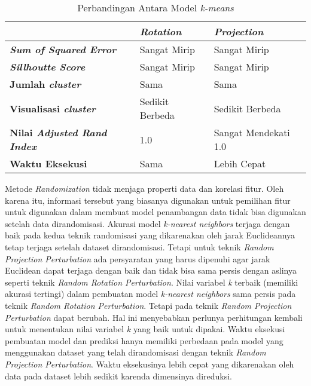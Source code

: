 \begin{table}
	\centering
	\caption{Perbandingan Antara Model \textit{k-means}}
	\begin{tabular}{|l|l|l|}
		\hline
		& \textbf{\textit{Rotation}} & \textbf{\textit{Projection}} \\ \hline
		\textbf{\textit{Sum of Squared Error}} & Sangat Mirip & Sangat Mirip \\
		\textbf{\textit{Sillhoutte Score}} & Sangat Mirip & Sangat Mirip \\
		\textbf{Jumlah \textit{cluster}} & Sama & Sama \\
		\textbf{Visualisasi \textit{cluster}} & Sedikit Berbeda & Sedikit Berbeda \\
		\textbf{Nilai \textit{Adjusted Rand Index}} & 1.0 & Sangat Mendekati 1.0 \\
		\textbf{Waktu Eksekusi} & Sama & Lebih Cepat \\
		\hline
	\end{tabular}
	\label{table:perbandingan-clustering}
\end{table}

Metode \textit{Randomization} tidak menjaga properti data dan korelasi fitur. Oleh karena itu, informasi tersebut yang biasanya digunakan untuk pemilihan fitur untuk digunakan dalam membuat model penambangan data tidak bisa digunakan setelah data dirandomisasi. Akurasi model \textit{k-nearest neighbors} terjaga dengan baik pada kedua teknik randomisasi yang dikarenakan oleh jarak Euclideannya tetap terjaga setelah dataset dirandomisasi. Tetapi untuk teknik \textit{Random Projection Perturbation} ada persyaratan yang harus dipenuhi agar jarak Euclidean dapat terjaga dengan baik dan tidak bisa sama persis dengan aslinya seperti teknik \textit{Random Rotation Perturbation}. Nilai variabel \textit{k} terbaik (memiliki akurasi tertingi) dalam pembuatan model \textit{k-nearest neighbors} sama persis pada teknik \textit{Random Rotation Perturbation}. Tetapi pada teknik \textit{Random Projection Perturbation} dapat berubah. Hal ini menyebabkan perlunya perhitungan kembali untuk menentukan nilai variabel \textit{k} yang baik untuk dipakai. Waktu eksekusi pembuatan model dan prediksi hanya memiliki perbedaan pada model yang menggunakan dataset yang telah dirandomisasi dengan teknik \textit{Random Projection Perturbation}. Waktu eksekusinya lebih cepat yang dikarenakan oleh data pada dataset lebih sedikit karenda dimensinya direduksi.

